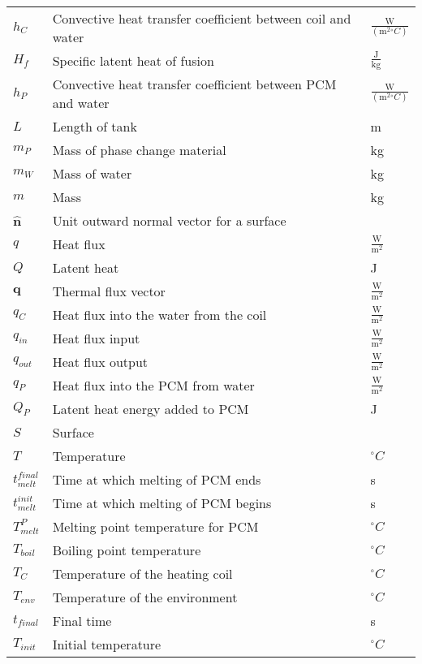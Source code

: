 \documentclass[12pt]{article}
\begin{document}
\begin{longtable*}{l l l}
\\
$h_{C}$ & Convective heat transfer coefficient between coil and water & $\frac{\text{W}}{(\text{m}^{2}{}^{\circ}C)}$
\\
$H_{f}$ & Specific latent heat of fusion & $\frac{\text{J}}{\text{kg}}$
\\
$h_{P}$ & Convective heat transfer coefficient between PCM and water & $\frac{\text{W}}{(\text{m}^{2}{}^{\circ}C)}$
\\
$L$ & Length of tank & m
\\
$m_{P}$ & Mass of phase change material & kg
\\
$m_{W}$ & Mass of water & kg
\\
$m$ & Mass & kg
\\
$\mathbf{\hat{n}}$ & Unit outward normal vector for a surface & 
\\
$q$ & Heat flux & $\frac{\text{W}}{\text{m}^{2}}$
\\
$Q$ & Latent heat & J
\\
$\mathbf{q}$ & Thermal flux vector & $\frac{\text{W}}{\text{m}^{2}}$
\\
$q_{C}$ & Heat flux into the water from the coil & $\frac{\text{W}}{\text{m}^{2}}$
\\
$q_{in}$ & Heat flux input & $\frac{\text{W}}{\text{m}^{2}}$
\\
$q_{out}$ & Heat flux output & $\frac{\text{W}}{\text{m}^{2}}$
\\
$q_{P}$ & Heat flux into the PCM from water & $\frac{\text{W}}{\text{m}^{2}}$
\\
$Q_{P}$ & Latent heat energy added to PCM & J
\\
$S$ & Surface & 
\\
$T$ & Temperature & ${}^{\circ}C$
\\
$t_{melt}^{final}$ & Time at which melting of PCM ends & s
\\
$t_{melt}^{init}$ & Time at which melting of PCM begins & s
\\
$T_{melt}^{P}$ & Melting point temperature for PCM & ${}^{\circ}C$
\\
$T_{boil}$ & Boiling point temperature & ${}^{\circ}C$
\\
$T_{C}$ & Temperature of the heating coil & ${}^{\circ}C$
\\
$T_{env}$ & Temperature of the environment & ${}^{\circ}C$
\\
$t_{final}$ & Final time & s
\\
$T_{init}$ & Initial temperature & ${}^{\circ}C$
\\

\end{longtable*}
\end{document}
